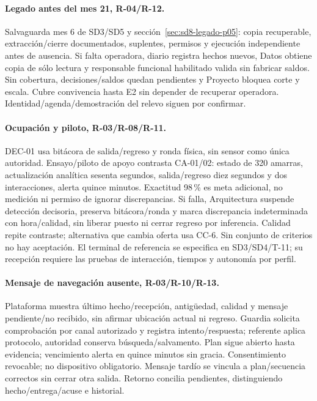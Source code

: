 \paragraph{Legado antes del mes 21, R-04/R-12.}
Salvaguarda mes 6 de SD3/SD5 y sección~\ref{sec:sd8-legado-p05}: copia recuperable, extracción/cierre documentados, suplentes, permisos y ejecución independiente antes de ausencia. Si falta operadora, diario registra hechos nuevos, Datos obtiene copia de sólo lectura y responsable funcional habilitado valida sin fabricar saldos. Sin cobertura, decisiones/saldos quedan pendientes y Proyecto bloquea corte y escala. Cubre convivencia hasta E2 sin depender de recuperar operadora. Identidad/agenda/demostración del relevo siguen por confirmar.

\paragraph{Ocupación y piloto, R-03/R-08/R-11.}
DEC-01 usa bitácora de salida/regreso y ronda física, sin sensor como única autoridad. Ensayo/piloto de apoyo contrasta CA-01/02: estado de 320 amarras, actualización analítica sesenta segundos, salida/regreso diez segundos y dos interacciones, alerta quince minutos. Exactitud 98\,\% es meta adicional, no medición ni permiso de ignorar discrepancias. Si falla, Arquitectura suspende detección decisoria, preserva bitácora/ronda y marca discrepancia indeterminada con hora/calidad, sin liberar puesto ni cerrar regreso por inferencia. Calidad repite contraste; alternativa que cambia oferta usa CC-6. Sin conjunto de criterios no hay aceptación. El terminal de referencia se especifica en SD3/SD4/T-11; su recepción requiere las pruebas de interacción, tiempos y autonomía por perfil.

\paragraph{Mensaje de navegación ausente, R-03/R-10/R-13.}
Plataforma muestra último hecho/recepción, antigüedad, calidad y mensaje pendiente/no recibido, sin afirmar ubicación actual ni regreso. Guardia solicita comprobación por canal autorizado y registra intento/respuesta; referente aplica protocolo, autoridad conserva búsqueda/salvamento. Plan sigue abierto hasta evidencia; vencimiento alerta en quince minutos sin gracia. Consentimiento revocable; no dispositivo obligatorio. Mensaje tardío se vincula a plan/secuencia correctos sin cerrar otra salida. Retorno concilia pendientes, distinguiendo hecho/entrega/acuse e historial. \parencite[numeral 17.4; restricciones 2--4]{sd8-c07}

